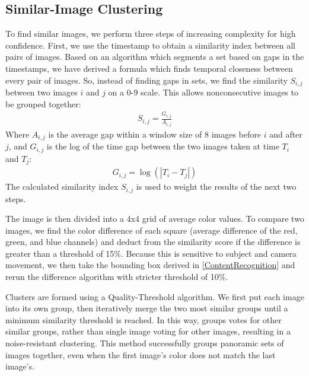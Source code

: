 \documentclass{article}
\begin{document}
\subsection{Similar-Image Clustering}
To find similar images, we perform three steps of increasing complexity for high confidence.
First, we use the timestamp to obtain a similarity index between all pairs of images. Based on an algorithm which segments a set based on gaps in the timestamps\cite{1292402}, we have derived a formula which finds temporal closeness between every pair of images. So, instead of finding gaps in sets, we find the similarity \(S_{i,j}\) between two images \(i\) and \(j\) on a 0-9 scale. This allows nonconsecutive images to be grouped together:
\begin{eqnarray}
S_{i,j}=\frac{G_{i,j}}{A_{i,j}}
\end{eqnarray}
Where \(A_{i,j}\) is the average gap within a window size of 8 images before \(i\) and after \(j\), and  \(G_{i,j}\) is the log of the time gap between the two images taken at time \(T_i\) and \(T_j\):
\begin{eqnarray}
G_{i,j}=\log(|T_i-T_j|)
\end{eqnarray}
The calculated similarity index \(S_{i,j}\) is used to weight the results of the next two steps.

The image is then divided into a 4x4 grid of average color values. To compare two images, we find the color difference of each square (average difference of the red, green, and blue channels) and deduct from the similarity score if the difference is greater than a threshold of 15\%. Because this is sensitive to subject and camera movement, we then take the bounding box derived in \ref{ContentRecognition} and rerun the difference algorithm with stricter threshold of 10\%.

Clusters are formed using a Quality-Threshold algorithm. We first put each image into its own group, then iteratively merge the two most similar groups until a minimum similarity threshold is reached. In this way, groups votes for other similar groups, rather than single image voting for other images, resulting in a noise-resistant clustering. This method successfully groups panoramic sets of images together, even when the first image's color does not match the last image's. %
\end{document}
